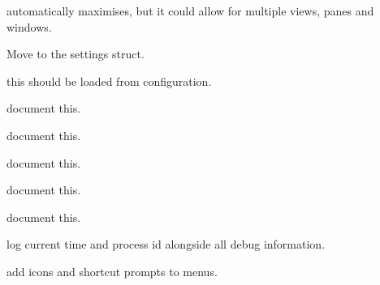 \begin{DoxyRefList}
\label{todo__todo000084}%
%
automatically maximises, but it could allow for multiple views, panes and windows.  
\item[Member \mbox{\hyperlink{imgui__main_8c_a3e6926ae65525832ed3c1ba9d8df636e}{just\+\_\+opened}} ]\label{todo__todo000005}%
%
Move to the settings struct.  
\item[Member \mbox{\hyperlink{imgui__main_8c_a39311d663f15b821995a09b0e642ba0a}{languages}} \mbox{[}20\mbox{]}]\label{todo__todo000085}%
%
this should be loaded from configuration.  
\item[Member \mbox{\hyperlink{imgui__main_8c_a7bbc6b2446f13572a0053772b874a71d}{layer\+\_\+manager}} (\mbox{\hyperlink{class_view}{View}} $\ast$view)]\label{todo__todo000033}%
%
document this.  
\item[Member \mbox{\hyperlink{imgui__main_8c_ad6e8773f513b582fc2b4bd9326bfbb81}{layer\+Manager}} (void)]\label{todo__todo000172}%
%
document this.  
\item[Member \mbox{\hyperlink{imgui__main_8c_acb0fe553e99e0c67e13993e307f56167}{layer\+Previous}} (void)]\label{todo__todo000173}%
%
document this.  
\item[Member \mbox{\hyperlink{imgui__main_8c_a203608629391f45d4a64b1b48c3daa3b}{line\+\_\+action}} (void)]\label{todo__todo000146}%
%
document this.  
\item[Member \mbox{\hyperlink{imgui__main_8c_af9ff1d7e362a83f5ed3c1975ad7d6970}{load\+\_\+formats}} (void)]\label{todo__todo000204}%
%
document this.  
\item[Member \mbox{\hyperlink{imgui__main_8c_ab32b7623b4a8feb9ddb21f061a97217a}{log\+\_\+debug}} (const char $\ast$msg)]\label{todo__todo000077}%
%
log current time and process id alongside all debug information.  
\item[Member \mbox{\hyperlink{imgui__main_8c_a0ddf1224851353fc92bfbff6f499fa97}{main}} (int argc, char $\ast$argv\mbox{[}\mbox{]})]\label{todo__todo000007}%
%
add icons and shortcut prompts to menus. 


\end{DoxyRefList}
